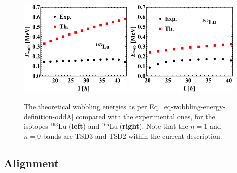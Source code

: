 \begin{figure}
    \centering
    \includegraphics[width=0.49\textwidth]{Chapters/Figures/Lu-exp-energies/fig6a.pdf}
    \includegraphics[width=0.49\textwidth]{Chapters/Figures/Lu-exp-energies/fig6b.pdf}
    \caption{The theoretical wobbling energies as per Eq. \ref{eq-wobbling-energy-definition-oddA} compared with the experimental ones, for the isotopes $^{163}$Lu (\textbf{left}) and $^{165}$Lu (\textbf{right}). Note that the $n=1$ and $n=0$ bands are TSD3 and TSD2 within the current description.}
    \label{experimental-wobbling-energies-Lu-aw1}
\end{figure}

\subsection{Alignment}

